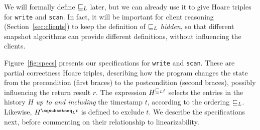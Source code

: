 We will formally define $\mathrel{\sqsubseteq_L}$ later, but we can already use it to
give Hoare triples for {\tt write} and {\tt scan}. In fact, it will be
important for client reasoning (Section~\ref{sec:clients}) to keep the
definition of $\mathrel{\sqsubseteq_L}$ \emph{hidden}, so that different snapshot
algorithms can provide different definitions, without influencing the
clients.
%

%
Figure~\ref{fig:specs} presents our specifications for {\tt write} and
{\tt scan}. These are partial correctness Hoare triples, describing
how the program changes the state from the precondition (first braces)
to the postcondition (second braces), possibly influencing the return
result $r$. %
%
The expression $H^{\hbox{}\mathrel{\sqsubseteq_L} t}$ selects the entries in the history
$H$ \emph{up to and including} the timestamp $t$, according to the
ordering $\mathrel{\sqsubseteq_L}$. Likewise, $H^{\hbox{}\sqsubsetneq_\ordlist t}$ is
defined to exclude $t$.
%
We describe the specifications next, before commenting on their
relationship to linearizability.


